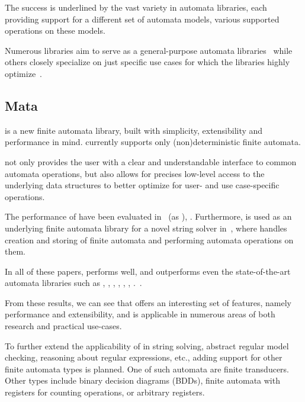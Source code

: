 The success is underlined by the vast variety in automata libraries, each providing support for a different set of automata models, various supported operations on these models.

Numerous libraries aim to serve as a general-purpose automata libraries~\cite{automatanet, tacas24_mata_10.1007/978-3-031-57249-4_7,fado} while others closely specialize on just specific use cases for which the libraries highly optimize~\cite{mona,automatajar}.

\subsection{Mata}

\mata is a new finite automata library, built with simplicity, extensibility and performance in mind.
\mata currently supports only (non)deterministic finite automata.

\mata not only provides the user with a clear and understandable interface to common automata operations, but also allows for precises low-level access to the underlying data structures to better optimize for user- and use case-specific operations.

The performance of \mata have been evaluated in~\cite{cade23_reasoning_regular_properties_comparision_DBLP:conf/cade/FiedorHHRSV23} (as \enfa), \cite{tacas24_mata_10.1007/978-3-031-57249-4_7}.
Furthermore, \mata is used as an underlying finite automata library for a novel string solver \noodler in~\cite{fm23fm23_equations_synergy_regular_constraints_DBLP:conf/fm/BlahoudekCCHHLS23, oopsla23_stabilization_DBLP:journals/pacmpl/ChenCHHLS23,tacas24_noodler_10.1007/978-3-031-57246-3_2}, where \mata handles creation and storing of finite automata and performing automata operations on them.

In all of these papers, \mata performs well, and outperforms even the state-of-the-art automata libraries such as \automatajar, \awali, \vata, \brics, \automatanet, \automatapy, \fado.~\cite{tacas24_mata_10.1007/978-3-031-57249-4_7}.

From these results, we can see that \mata offers an interesting set of features, namely performance and extensibility, and is applicable in numerous areas of both research and practical use-cases.

To further extend the applicability of \mata in string solving, abstract regular model checking, reasoning about regular expressions, etc., adding support for other finite automata types is planned.
One of such automata are finite transducers.
Other types include binary decision diagrams (BDDs), finite automata with registers for counting operations, or arbitrary registers.


